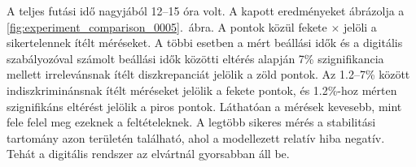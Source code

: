 A teljes futási idő nagyjából 12--15 óra volt. A kapott eredményeket ábrázolja a \ref{fig:experiment_comparison_0005}.~ábra.
A pontok közül fekete $\times$ jelöli a sikertelennek ítélt méréseket. A többi esetben a mért beállási idők és a digitális 
szabályozóval számolt beállási idők közötti eltérés alapján 7\% szignifikancia mellett irrelevánsnak ítélt diszkrepanciát 
jelölik a zöld pontok. Az 1.2--7\% között indiszkriminánsnak ítélt méréseket jelölik a fekete pontok, és 1.2\%-hoz mérten 
szignifikáns eltérést jelölik a piros pontok. Láthatóan a mérések kevesebb, mint fele felel meg ezeknek a feltételeknek. 
A legtöbb sikeres mérés a stabilitási tartomány azon területén található, ahol a modellezett relatív hiba negatív. Tehát 
a digitális rendszer az elvártnál gyorsabban áll be. 
